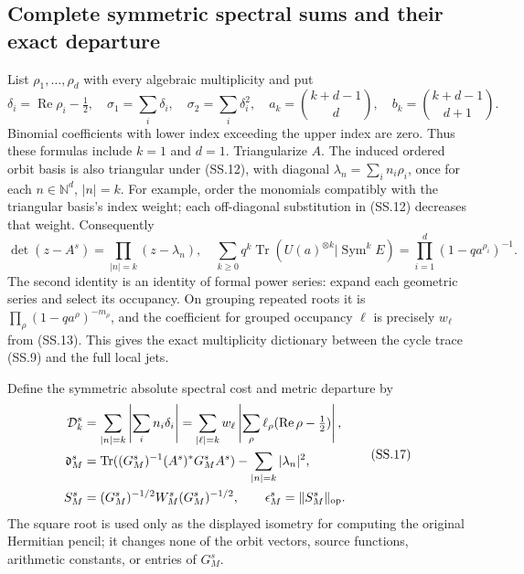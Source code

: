 \subsection{Complete symmetric spectral sums and their exact departure}

List \(\rho_1,\ldots,\rho_d\) with every algebraic
multiplicity and put
\[
 \delta_i=\operatorname{Re}\rho_i-\tfrac12,\quad
 \sigma_1=\sum_i\delta_i,\quad \sigma_2=\sum_i\delta_i^2,
 \quad a_k=\binom{k+d-1}{d},\quad
 b_k=\binom{k+d-1}{d+1}.                               \tag{SS.15}
\]
Binomial coefficients with lower index exceeding the upper index
are zero.  Thus these formulas include \(k=1\) and \(d=1\).
Triangularize \(A\).  The induced ordered orbit basis is also
triangular under (SS.12), with diagonal
\(\lambda_n=\sum_i n_i\rho_i\), once for each
\(n\in\mathbb N^d\), \(|n|=k\).  For example, order
the monomials compatibly with the triangular basis's index weight;
each off-diagonal substitution in (SS.12) decreases that weight.
Consequently
\[
 \det(z-A^s)=\prod_{|n|=k}(z-\lambda_n),\quad
 \sum_{k\ge0}q^k\operatorname{Tr}(U(a)^{\otimes k}|\operatorname{Sym}^kE)
      =\prod_{i=1}^d(1-q a^{\rho_i})^{-1}.              \tag{SS.16}
\]
The second identity is an identity of formal power series: expand
each geometric series and select its occupancy.  On grouping repeated
roots it is \(\prod_\rho(1-q a^\rho)^{-m_\rho}\), and
the coefficient for grouped occupancy \(\ell\) is precisely
\(w_\ell\) from (SS.13).  This gives the exact multiplicity
dictionary between the cycle trace (SS.9) and the full local jets.

Define the symmetric absolute spectral cost and metric departure by
\[
 \begin{split}
 \mathcal D_k^s&=\sum_{|n|=k}\left|\sum_i n_i\delta_i\right|
       =\sum_{|\ell|=k}w_\ell
                      \left|\sum_\rho\ell_\rho
                              (\operatorname{Re}\rho-\tfrac12)\right|,\\
 \mathfrak d_M^s&=
 \operatorname{Tr}((G_M^s)^{-1}(A^s)^*G_M^s A^s)
                         -\sum_{|n|=k}|\lambda_n|^2,\\
 S_M^s&=(G_M^s)^{-1/2}W_M^s(G_M^s)^{-1/2},\qquad
 \epsilon_M^s=\|S_M^s\|_{\rm op}.
 \end{split}                                                   \tag{SS.17}
\]
The square root is used only as the displayed isometry for computing
the original Hermitian pencil; it changes none of the orbit vectors,
source functions, arithmetic constants, or entries of \(G_M^s\).

